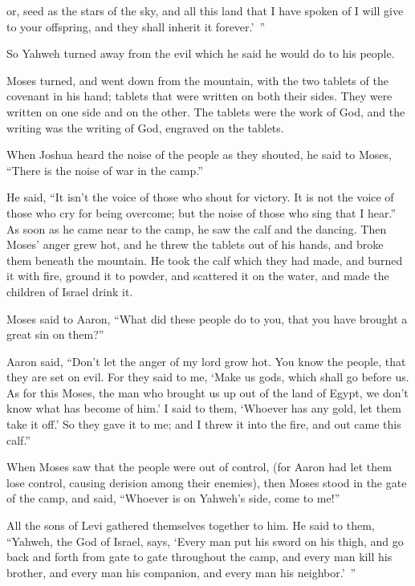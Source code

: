 {{or, seed} as the stars of the sky, and all this land that I have spoken of I will give to your offspring, and they shall inherit it forever.’ ”
\par }{\PP {}So Yahweh turned away from the evil which he said he would do to his people.
\par }{\PP {}Moses turned, and went down from the mountain, with the two tablets of the covenant in his hand; tablets that were written on both their sides. They were written on one side and on the other.
The tablets were the work of God, and the writing was the writing of God, engraved on the tablets.
\par }{\PP {}When Joshua heard the noise of the people as they shouted, he said to Moses, “There is the noise of war in the camp.”
\par }{\PP {}He said, “It isn’t the voice of those who shout for victory. It is not the voice of those who cry for being overcome; but the noise of those who sing that I hear.”
As soon as he came near to the camp, he saw the calf and the dancing. Then Moses’ anger grew hot, and he threw the tablets out of his hands, and broke them beneath the mountain.
He took the calf which they had made, and burned it with fire, ground it to powder, and scattered it on the water, and made the children of Israel drink it.
\par }{\PP {}Moses said to Aaron, “What did these people do to you, that you have brought a great sin on them?”
\par }{\PP {}Aaron said, “Don’t let the anger of my lord grow hot. You know the people, that they are set on evil.
For they said to me, ‘Make us gods, which shall go before us. As for this Moses, the man who brought us up out of the land of Egypt, we don’t know what has become of him.’
I said to them, ‘Whoever has any gold, let them take it off.’ So they gave it to me; and I threw it into the fire, and out came this calf.”
\par }{\PP {}When Moses saw that the people were out of control, (for Aaron had let them lose control, causing derision among their enemies),
then Moses stood in the gate of the camp, and said, “Whoever is on Yahweh’s side, come to me!”
\par }{\PP All the sons of Levi gathered themselves together to him.
He said to them, “Yahweh, the God of Israel, says, ‘Every man put his sword on his thigh, and go back and forth from gate to gate throughout the camp, and every man kill his brother, and every man his companion, and every man his neighbor.’ ”
}
